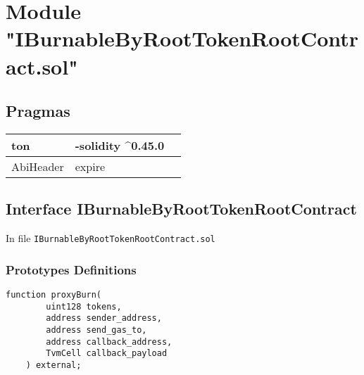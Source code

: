 
\section{Module "IBurnableByRootTokenRootContract.sol"}


\subsection{Pragmas}


\noindent\begin{tabular}{|l|l|p{5cm}|}\hline
ton & -solidity \^{}0.45.0 &\\\hline
AbiHeader &  expire &\\\hline
\end{tabular}


\subsection{Interface IBurnableByRootTokenRootContract}


In file {\tt IBurnableByRootTokenRootContract.sol}

\subsubsection{Prototypes Definitions}

\vspace{2cm}

\begin{lstlisting}[firstnumber=5]
    function proxyBurn(
        uint128 tokens,
        address sender_address,
        address send_gas_to,
        address callback_address,
        TvmCell callback_payload
    ) external;
\end{lstlisting}
